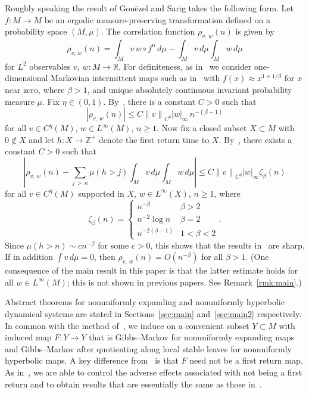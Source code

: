 \documentclass[10pt]{amsart}
\theoremstyle{definition}\newtheorem{defi}[theo]{Definition}\newtheorem{rema}[theo]{Remark}\newtheorem{exam}[theo]{Example}\newtheorem{exem}[theo]{Example}\newtheorem{nota}[theo]{Notation}
\newcommand{\R}{\mathbb{R}}
\newcommand{\Z}{\mathbb{Z}}
\begin{document}
Roughly speaking the result of Gou\"ezel and Sarig takes the following form. Let $f:M\to M$ be an ergodic measure-preserving transformation defined on a probability space $(M,\mu)$. The correlation function $\rho_{v,\,w}(n)$ is given by
\begin{equation}\label{eq:rho}
 \rho_{v,\,w}(n)=\int_M v\,w\circ f^n\,d\mu-\int_Mv\,d\mu\int_Mw\,d\mu
\end{equation}
for $L^2$ observables $v,\,w:M\to\R$. For definiteness, as in~\cite{Gouezel04a,Sarig02} we consider one-dimensional Markovian intermittent maps such as in~\cite{LSV99} with $f(x)\approx x^{1+1/\beta}$ for $x$ near zero, where $\beta>1$, and unique absolutely continuous invariant probability measure $\mu$. Fix $\eta\in(0,1)$. By~\cite{Young99}, there is a constant $C>0$ such that
\[
\left|\rho_{v,\,w}(n)\right|\le C{\|v\|}_{C^\eta}|w|_\infty\,n^{-(\beta-1)}
\]
for all $v\in C^\eta(M)$, $w\in L^\infty(M)$, $n\ge1$. Now fix a closed subset $X\subset M$ with $0\not\in X$ and let $h:X\to\Z^+$ denote the first return time to $X$. By~\cite{Gouezel04a,Sarig02}, there exists a constant $C>0$ such that
\begin{equation}\label{eq:GS}
 \left|\rho_{v,\,w}(n)-\sum_{j\,>\,n}\mu(h>j)\int_M v\,d\mu\int_M w\,d\mu
\right|\le C{\|v\|}_{C^\eta}|w|_\infty\zeta_\beta(n)
\end{equation}
for all $v\in C^\eta(M)$ supported in $X$, $w\in L^\infty(X)$, $n\ge1$, where
\begin{equation}\label{eq:zeta}
\zeta_\beta(n)=
\begin{cases}
n^{-\beta} & \beta>2 \\
n^{-2}\log n & \beta=2 \\
n^{-2(\beta-1)} & 1<\beta<2
\end{cases}.
\end{equation}
Since $\mu(h>n)\sim cn^{-\beta}$ for some $c>0$, this shows that the results in~\cite{Young99} are sharp. If in addition $\int v\,d\mu=0$, then $\rho_{v,\,w}(n)=O(n^{-\beta})$ for all $\beta>1$. (One consequence of the main result in this paper is that the latter estimate holds for all $w\in L^\infty(M)$; this is not shown in previous papers. See Remark~\ref{rmk:main}.)



Abstract theorems for nonuniformly expanding and nonuniformly hyperbolic dynamical systems are stated in Sections~\ref{sec:main} and~\ref{sec:main2} respectively. In common with the method of~\cite{Gouezel04a,Sarig02}, we induce on a convenient subset $Y\subset M$ with induced map $F:Y\to Y$ that is Gibbs--Markov for nonuniformly expanding maps and Gibbs--Markov after quotienting along local stable leaves for nonuniformly hyperbolic maps. A key difference from~\cite{Gouezel04a,Sarig02} is that $F$ need not be a first return map. As in~\cite{BruinTerhesiu18}, we are able to control the adverse effects associated with not being a first return and to obtain results that are essentially the same as those in~\cite{Gouezel04a,Sarig02}.
\end{document}
